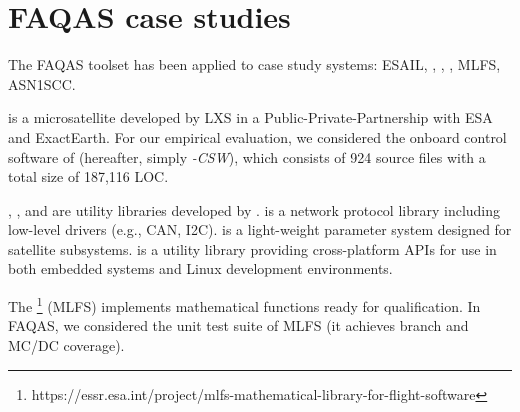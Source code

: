
\section{FAQAS case studies}
\label{chapter:caseStudies}

The FAQAS toolset has been applied to  case study systems:
ESAIL, \GCSP{}, \PARAM{}, \UTIL{}, MLFS, ASN1SCC.
 
 is a microsatellite developed by LXS in a Public-Private-Partnership with ESA and ExactEarth. For our empirical evaluation, we considered the onboard control software of \SAIL{} (hereafter, simply \SAIL{}\emph{-CSW}), which consists of 924 source files with a total size of 187,116 LOC. 

\GCSP{}, \PARAM{}, and \UTIL{}  are utility libraries developed by \ONE.
\emph{\GCSP{}} is a network protocol library including low-level drivers (e.g., CAN, I2C).
{\PARAM{}} is a light-weight parameter system designed for \ONE satellite subsystems. 
{\UTIL{}} is a utility library providing cross-platform APIs for use in both embedded systems and Linux development environments.


The \footnote{https://essr.esa.int/project/mlfs-mathematical-library-for-flight-software} (MLFS) implements mathematical functions ready for qualification. 
In FAQAS, we considered the unit test suite of MLFS (it achieves branch and MC/DC coverage).


